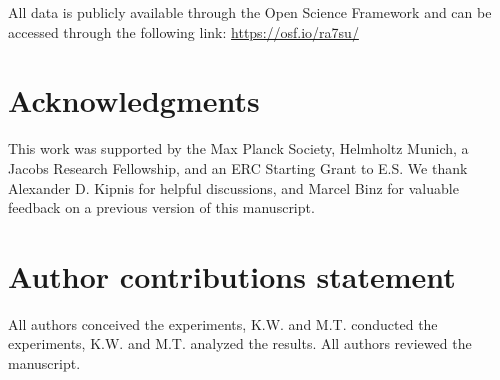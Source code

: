 \documentclass[fleqn,10pt]{wlscirep}
\begin{document}
All data is publicly available through the Open Science Framework and can be accessed through the following link: \hyperlink{https://osf.io/ra7su/}{https://osf.io/ra7su/}

\section*{Acknowledgments}

This work was supported by the Max Planck Society, Helmholtz Munich, a Jacobs Research Fellowship, and an ERC Starting Grant to E.S. We thank Alexander D. Kipnis for helpful discussions, and Marcel Binz for valuable feedback on a previous version of this manuscript.

\section*{Author contributions statement}
All authors conceived the experiments, K.W. and M.T. conducted the experiments, K.W. and M.T. analyzed the results. All authors reviewed the manuscript. 


\end{document}
